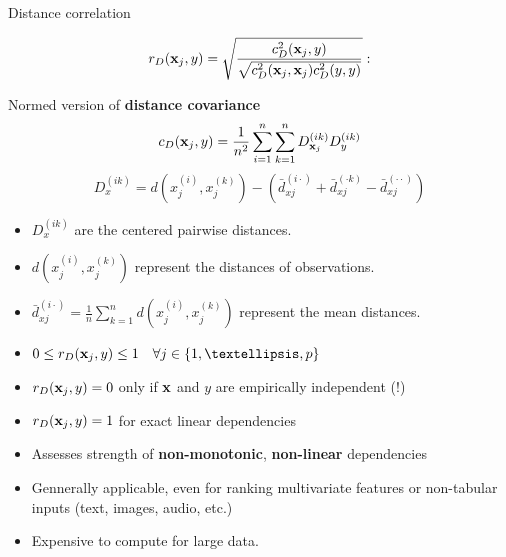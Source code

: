 \documentclass[11pt,compress,t,notes=noshow, xcolor=table]{beamer}
\begin{document}
  \begin{vbframe}{Distance correlation}


  $$
    r_D(\mathbf{x}_j, y) = \sqrt{\frac{c_{D}^2(\mathbf{x}_j, y)}{\sqrt{c_{D}^2(\mathbf{x}_j, \mathbf{x}_j) c_{D}^2(y, y)}}}:
  $$

  Normed version of \textbf{distance covariance} $$c_{D}(\mathbf{x}_j, y) = \frac{1}{n^2}\sum^n_{i=1}\sum^n_{k=1} D^{(ik)}_{\mathbf{x}_j} D^{(ik)}_{y}$$
  $$ D^{(ik)}_{x} = d\left(x^{(i)}_j, x^{(k)}_j\right) - (\bar{d}^{(i\cdot)}_{xj} + \bar{d}^{(\cdot k)}_{xj} - \bar{d}^{(\cdot \cdot)}_{xj}) $$
  \begin{itemize}
  \item $D^{(ik)}_{x}$ are the centered pairwise distances.
  \item $d\left(x^{(i)}_j, x^{(k)}_j\right)$ represent the distances of observations.
  \item $\bar{d}^{(i\cdot)}_{xj} = \tfrac{1}{n} \sum^n_{k=1} d\left(x^{(i)}_j, x^{(k)}_j\right)$ represent the mean distances.


  \end{itemize}

  \framebreak

  \begin{itemize}
    \setlength{\itemsep}{1.0em}
  \item $0 \leq r_D(\xj, y) \leq 1 \quad \forall  j \in \{1, …, p\}$
  \item $r_D(\mathbf{x}_j, y) = 0$ only if $\mathbf{x}$ and $y$ are empirically independent (!)
  \item $r_D(\mathbf{x}_j, y) = 1$ for exact linear dependencies
  \item Assesses strength of \textbf{non-monotonic}, \textbf{non-linear}  dependencies
  \item Gennerally applicable, even for ranking multivariate features or non-tabular inputs (text, images, audio, etc.)
  \item Expensive to compute for large data.
  \end{itemize}


\end{vbframe}
\end{document}
